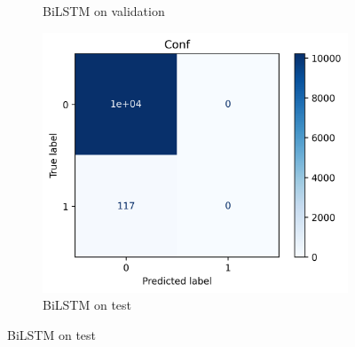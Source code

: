 \documentclass[utf8x]{ctexart}
\begin{document}
\begin{figure}[htb]
\begin{subfigure}[b]{0.32\textwidth}
    \caption{BiLSTM on validation}
    \label{fig:BiLSTM_confusion_val}
  \end{subfigure}
  \begin{subfigure}[b]{0.32\textwidth}
    \centering
    \includegraphics[width=\textwidth]{../images/BiLSTM_test_conf.png}
    \caption{BiLSTM on test}
    \label{fig:BiLSTM_confusion_test}
  \end{subfigure}



\end{figure}
\end{document}
